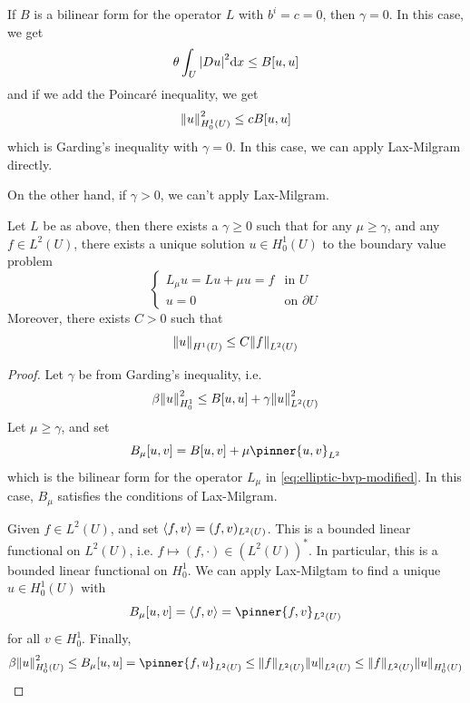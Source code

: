\documentclass{article}
\begin{document}
\begin{remark}
    If \(B\) is a bilinear form for the operator \(L\) with \(b^i = c = 0\), then \(\gamma = 0\). In this case, we get
    \[\theta\int_U \abs{D u}^2 \dd x \le B[u, u]\]
    and if we add the Poincar\'e inequality, we get
    \[\norm{u}^2_{H^1_0(U)} \le cB[u, u]\]
    which is Garding's inequality with \(\gamma = 0\). In this case, we can apply Lax-Milgram directly.
\end{remark}

On the other hand, if \(\gamma > 0\), we can't apply Lax-Milgram.

\begin{theorem}
    \label{thm:gamma-exists-unique}
    Let \(L\) be as above, then there exists a \(\gamma \ge 0\) such that for any \(\mu \ge \gamma\), and any \(f \in L^2(U)\), there exists a unique solution \(u \in H^1_0(U)\) to the boundary value problem
    \begin{equation}
        \label{eq:elliptic-bvp-modified}
        \begin{cases}
            L_\mu u = Lu + \mu u = f & \text{in }U \\
            u = 0 & \text{on }\partial U
        \end{cases}
    \end{equation}
    Moreover, there exists \(C > 0\) such that
    \[\norm{u}_{H^1(U)} \le C\norm{f}_{L^2(U)}\]
\end{theorem}

\begin{proof}
    Let \(\gamma\) be from Garding's inequality, i.e.
    \[\beta\norm{u}^2_{H_0^1} \le B[u, u] + \gamma\norm{u}^2_{L^2(U)}\]
    Let \(\mu \ge \gamma\), and set
    \[B_\mu[u, v] = B[u, v] + \mu\pinner{u, v}_{L^2}\]
    which is the bilinear form for the operator \(L_\mu\) in \cref{eq:elliptic-bvp-modified}. In this case, \(B_\mu\) satisfies the conditions of Lax-Milgram.

\lec

    Given \(f \in L^2(U)\), and set \(\left\langle f, v \right\rangle = (f, v)_{L^2(U)}\). This is a bounded linear functional on \(L^2(U)\), i.e. \(f \mapsto (f, \cdot) \in (L^2(U))^*\). In particular, this is a bounded linear functional on \(H_0^1\). We can apply Lax-Milgtam to find a unique \(u \in H_0^1(U)\) with
    \[B_\mu[u, v] = \inner{f, v} = \pinner{f, v}_{L^2(U)}\]
    for all \(v \in H_0^1\). Finally,
    \[\beta\norm{u}_{H_0^1(U)}^2 \le B_\mu[u, u] = \pinner{f, u}_{L^2(U)} \le \norm{f}_{L^2(U)}\norm{u}_{L^2(U)} \le \norm{f}_{L^2(U)} \norm{u}_{H_0^1(U)}\]
\end{proof}
\end{document}

